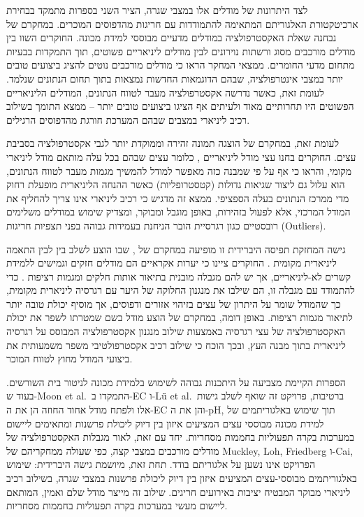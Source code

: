 לצד היתרונות של מודלים אלו במצבי שגרה, הציר השני בספרות מתמקד בבחירת ארכיטקטורת האלגוריתם המתאימה להתמודדות עם חריגות מהדפוסים המוכרים. במחקרם של  נבחנה שאלת האקסטרפולציה במודלים מדעיים מבוססי למידת מכונה. החוקרים השוו בין מודלים מורכבים מסוג  ורשתות נוירונים לבין מודלים ליניאריים פשוטים, תוך התמקדות בבעיות מתחום מדעי החומרים. ממצאי המחקר הראו כי מודלים מורכבים נוטים להציג ביצועים טובים יותר במצבי אינטרפולציה, שבהם הדוגמאות החדשות נמצאות בתוך תחום הנתונים שנלמד. לעומת זאת, כאשר נדרשה אקסטרפולציה מעבר לטווח הנתונים, המודלים הליניאריים הפשוטים היו תחרותיים מאוד ולעיתים אף הציגו ביצועים טובים יותר -- ממצא התומך בשילוב רכיב ליניארי במצבים שבהם המערכת חורגת מהדפוסים הרגילים.

לעומת זאת, במחקרם של  הוצגה תמונה זהירה וממוקדת יותר לגבי אקסטרפולציה בסביבת עצים. החוקרים בחנו עצי מודל ליניאריים , כלומר עצים שבהם בכל עלה מותאם מודל ליניארי מקומי, והראו כי אף על פי שמבנה כזה מאפשר למודל להמשיך מגמות מעבר לטווח הנתונים, הוא עלול גם ליצור שגיאות גדולות (קטסטרופליות) כאשר ההנחה הליניארית מופעלת רחוק מדי ממרכז הנתונים בעלה הספציפי. ממצא זה מדגיש כי רכיב ליניארי אינו צריך להחליף את המודל המרכזי, אלא לפעול בזהירות, באופן מוגבל ומבוקר, ומצדיק שימוש במודלים משלימים רובסטיים כגון רגרסיית הובר  הניחנת בעמידות גבוהה בפני תצפיות חריגות (Outliers).

גישה המחזקת תפיסה היברידית זו מופיעה במחקרם של , שבו הוצע לשלב בין  לבין התאמה ליניארית מקומית . החוקרים ציינו כי יערות אקראיים הם מודלים חזקים וגמישים ללמידת קשרים לא-ליניאריים, אך יש להם מגבלה מובנית בתיאור אותות חלקים ומגמות רציפות . כדי להתמודד עם מגבלה זו, הם שילבו את מנגנון החלוקה של היער עם רגרסיה ליניארית מקומית, כך שהמודל שומר על היתרון של עצים בזיהוי אזורים ודפוסים, אך מוסיף יכולת טובה יותר לתיאור מגמות רציפות. באופן דומה, במחקרם של  הוצע מודל בשם  שמטרתו לשפר את יכולת האקסטרפולציה של עצי רגרסיה באמצעות שילוב מנגנון אקסטרפולציה המבוסס על רגרסיה ליניארית בתוך מבנה העץ, ובכך הוכח כי שילוב רכיב אקסטרפולטיבי משפר משמעותית את ביצועי המודל מחוץ לטווח המוכר.

הספרות הקיימת מצביעה על היתכנות גבוהה לשימוש בלמידת מכונה לניטור בית השורשים. בעוד ש-Moon et al.\ התמקדו ב-EC ו-Lü et al.\ ברטיבות, פרויקט זה שואף לשלב גישות אלו ולפתח מודל אחוד החוזה הן את ה-EC והן את ה-pH, תוך שימוש באלגוריתמים של למידת מכונה מבוססי עצים המציעים איזון בין דיוק ליכולת פרשנות ומתאימים ליישום במערכות בקרה תפעוליות בחממות מסחריות. יחד עם זאת, לאור מגבלות האקסטרפולציה של מודלים מורכבים במצבי קצה, כפי שעולה ממחקריהם של Muckley, Loh, Friedberg ו-Cai, הפרויקט אינו נשען על אלגוריתם בודד. תחת זאת, מיושמת גישה היברידית: שימוש באלגוריתמים מבוססי-עצים המציעים איזון בין דיוק ליכולת פרשנות במצבי שגרה, בשילוב רכיב ליניארי מבוקר המבטיח יציבות באירועים חריגים. שילוב זה מייצר מודל שלם ואמין, המותאם ליישום מעשי במערכות בקרה תפעוליות בחממות מסחריות.

